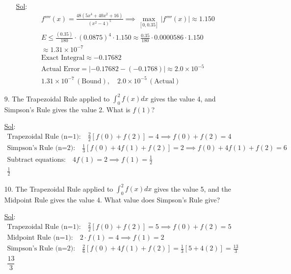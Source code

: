 \begin{enumerate}
\begin{enumerate}
    \underline{Sol}:\\

\[
    \begin{array}{l}
       f''''(x) = \frac{48(5x^4 + 40x^2 + 16)}{(x^2 - 4)^5} \implies \max_{[0,0.35]} |f''''(x)| \approx 1.150 \\
       E \leq \frac{(0.35)}{180} \cdot (0.0875)^4 \cdot 1.150 \approx \frac{0.35}{180} \cdot 0.0000586 \cdot 1.150 \\
       \approx 1.31 \times 10^{-7} \\
       \text{Exact Integral} \approx -0.17682 \\
       \text{Actual Error} = | -0.17682 - (-0.1768) | \approx 2.0 \times 10^{-5} \\
       \boxed{1.31 \times 10^{-7}} \, (\text{Bound}), \quad \boxed{2.0 \times 10^{-5}} \, (\text{Actual})
    \end{array}
\]

  \end{enumerate}

  \item[9.] The Trapezoidal Rule applied to \(\int_{0}^{2} f(x) dx\) gives the value 4, and Simpson's Rule gives the value 2. What is \(f(1)\)?
  
  \underline{Sol}:\\

  \[
      \begin{array}{l}
         \text{Trapezoidal Rule (n=1):} \quad \frac{2}{2}[f(0) + f(2)] = 4 \implies f(0) + f(2) = 4 \\
         \text{Simpson’s Rule (n=2):} \quad \frac{1}{3}[f(0) + 4f(1) + f(2)] = 2 \implies f(0) + 4f(1) + f(2) = 6 \\
         \text{Subtract equations:} \quad 4f(1) = 2 \implies f(1) = \frac{1}{2} \\
         \boxed{\frac{1}{2}}
      \end{array}
  \]
  
  \item[10.] The Trapezoidal Rule applied to \(\int_{0}^{2} f(x) dx\) gives the value 5, and the Midpoint Rule gives the value 4. What value does Simpson's Rule give?
  
  \underline{Sol}:\\

  \[
      \begin{array}{l}
         \text{Trapezoidal Rule (n=1):} \quad \frac{2}{2}[f(0) + f(2)] = 5 \implies f(0) + f(2) = 5 \\
         \text{Midpoint Rule (n=1):} \quad 2 \cdot f(1) = 4 \implies f(1) = 2 \\
         \text{Simpson’s Rule (n=2):} \quad \frac{2}{6}[f(0) + 4f(1) + f(2)] = \frac{1}{3}[5 + 4(2)] = \frac{13}{3} \\
         \boxed{\dfrac{13}{3}}
      \end{array}
  \]
  

\end{enumerate}
